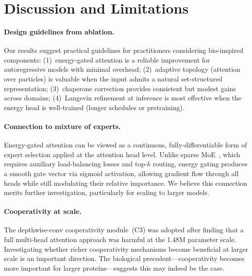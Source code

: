 \documentclass[10pt]{article}
\begin{document}
\section{Discussion and Limitations}
\label{sec:discussion}

\paragraph{Design guidelines from ablation.}
Our results suggest practical guidelines for practitioners considering
bio-inspired components: (1)~energy-gated attention is a reliable
improvement for autoregressive models with minimal overhead;
(2)~adaptive topology (attention over particles) is valuable when the
input admits a natural set-structured representation; (3)~chaperone
correction provides consistent but modest gains across domains;
(4)~Langevin refinement at inference is most effective when the energy
head is well-trained (longer schedules or pretraining).

\paragraph{Connection to mixture of experts.}
Energy-gated attention can be viewed as a continuous, fully-differentiable
form of expert selection applied at the attention head level.  Unlike
sparse MoE~\citep{fedus2022switch}, which requires auxiliary load-balancing
losses and top-$k$ routing, energy gating produces a smooth gate vector via
sigmoid activation, allowing gradient flow through all heads while still
modulating their relative importance.  We believe this connection merits
further investigation, particularly for scaling to larger models.

\paragraph{Cooperativity at scale.}
The depthwise-conv cooperativity module~(C3) was adopted after finding
that a full multi-head attention approach was harmful at the 1.48M
parameter scale.  Investigating whether richer cooperativity mechanisms
become beneficial at larger scale is an important direction.  The
biological precedent---cooperativity becomes more important for larger
proteins---suggests this may indeed be the case.
\end{document}
